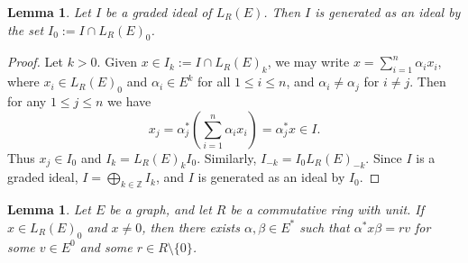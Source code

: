 \documentclass[11pt]{amsart}
\newtheorem{lemma}[theorem]{Lemma}
\theoremstyle{remark}
\numberwithin{equation}{section}
\newcommand{\Z}{\mathbb{Z}}
\begin{document}
\begin{lemma} \label{ideal-gen-by-zero-part}
Let $I$ be a graded ideal of $L_R(E)$.  Then $I$ is generated as an ideal by the set $I_0 := I \cap L_R(E)_0$. 
\end{lemma}

\begin{proof}
Let $k >0$.  Given $x \in I_k :=I \cap  L_R(E)_k$, we may write $x = \sum_{i=1}^n \alpha_i x_i$, where $x_i \in L_R(E)_0$ and $\alpha_i \in E^k$ for all $1 \leq i \leq n$, and $\alpha_i \neq \alpha_j$ for $i \neq j$.  Then for any $1 \leq j \leq n$ we have $$x_j = \alpha_j^* \left(  \sum_{i=1}^n \alpha_i x_i \right) = \alpha_j^* x \in I.$$  Thus $x_j \in I_0$ and $I_k = L_R(E)_k I_0$.  Similarly, $I_{-k} = I_0 L_R(E)_{-k}$.  Since $I$ is a graded ideal, $I = \bigoplus_{k \in \Z} I_k$, and $I$ is generated as an ideal by $I_0$.
\end{proof}


\begin{lemma} \label{zero-part-zero}
Let $E$ be a graph, and let $R$ be a commutative ring with unit.  If $x \in L_R(E)_0$ and $x \neq 0$, then there exists $\alpha, \beta \in E^*$ such that $\alpha^* x \beta = rv$ for some $v \in E^0$ and some $r \in R \setminus \{ 0 \}$.
\end{lemma}
\end{document}
